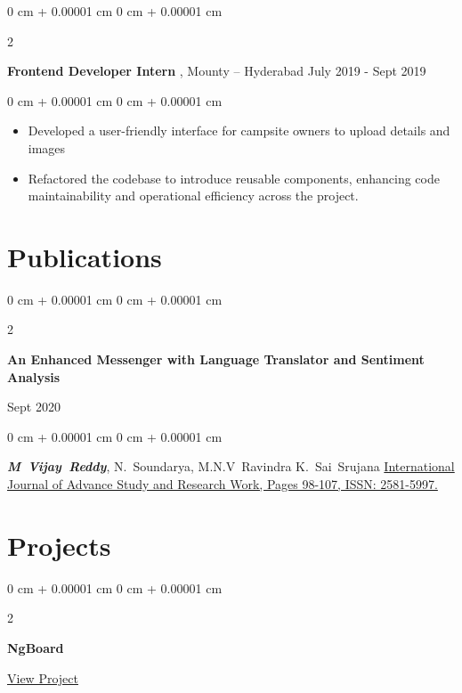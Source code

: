 \documentclass[10pt, letterpaper]{article}
\newenvironment{highlights}{
    \begin{itemize}[
        topsep=0.10 cm,
        parsep=0.10 cm,
        partopsep=0pt,
        itemsep=0pt,
        leftmargin=0 cm + 10pt
    ]
}{
    \end{itemize}
} %
\newenvironment{onecolentry}{
    \begin{adjustwidth}{
        0 cm + 0.00001 cm
    }{
        0 cm + 0.00001 cm
    }
}{
    \end{adjustwidth}
} %
\newenvironment{twocolentry}[2][]{
    \onecolentry
    \def\secondColumn{#2}
    \setcolumnwidth{\fill, 4.5 cm}
    \begin{paracol}{2}
}{
    \switchcolumn \raggedleft \secondColumn
    \end{paracol}
    \endonecolentry
} %
\begin{document}
			\begin{twocolentry}{
				July 2019 - Sept 2019        }
				\textbf{Frontend Developer Intern
					}, Mounty -- Hyderabad \end{twocolentry}

				\vspace{0.10 cm}
				\begin{onecolentry}
					\begin{highlights}
						\item Developed a user-friendly interface for campsite owners to upload details and images
						\item Refactored the codebase to introduce reusable components, enhancing code maintainability and
						operational efficiency across the project.


					\end{highlights}
				\end{onecolentry}
				\section{Publications}
				\begin{samepage}
					\begin{twocolentry}{
							Sept 2020
						}
						\textbf{An Enhanced Messenger with Language Translator and Sentiment Analysis}
					\end{twocolentry}
					\vspace{0.10 cm}
					\begin{onecolentry}
						\mbox{\textbf{\textit{M Vijay Reddy}}},
						\mbox{N. Soundarya},
						\mbox{M.N.V Ravindra}
						\mbox{K. Sai Srujana}
						\vspace{0.10 cm}
						\href{https://www.ijasrw.com/pdf/ICROIRT20/IJConfA15.pdf}{International Journal of Advance Study and Research Work, Pages 98-107, ISSN: 2581-5997.}
					\end{onecolentry}
				\end{samepage}
				\section{Projects}
				\begin{twocolentry}{
						\href{https://vijay18399.github.io/ngBoard/}{View Project}
					}
					\textbf{NgBoard}
				\end{twocolentry}
\end{document}
